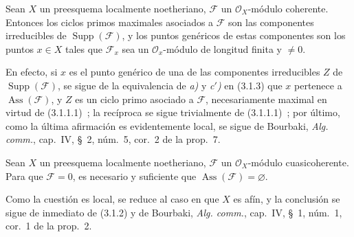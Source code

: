 \begin{corollary}[3.1.4]
\label{IV.2.3.1.4-fr}
Sean $X$ un preesquema localmente noetheriano, $\mathcal F$ un
$\mathcal O_X$-módulo coherente. Entonces los ciclos primos maximales asociados
a $\mathcal F$ son las componentes irreducibles de
$\operatorname{Supp}(\mathcal F)$, y los puntos genéricos de estas componentes
son los puntos $x\in X$ tales que $\mathcal F_x$ sea un
$\mathcal O_x$-módulo de longitud finita y $\ne0$.
\end{corollary}

En efecto, si $x$ es el punto genérico de una de las componentes irreducibles
$Z$ de $\operatorname{Supp}(\mathcal F)$, se sigue de la equivalencia de
\emph{a)} y \emph{c$'$)} en (3.1.3) que $x$ pertenece a
$\operatorname{Ass}(\mathcal F)$, y $Z$ es un ciclo primo asociado a
$\mathcal F$, necesariamente maximal en virtud de (3.1.1.1)~; la recíproca se
sigue trivialmente de (3.1.1.1)~; por último, como la última afirmación es
evidentemente local, se sigue de Bourbaki, \emph{Alg. comm.}, cap.~IV, \S~2,
núm.~5, cor.~2 de la prop.~7.

\begin{corollary}[3.1.5]
Sean $X$ un preesquema localmente noetheriano, $\mathcal F$ un
$\mathcal O_X$-módulo cuasicoherente. Para que $\mathcal F=0$, es necesario y
suficiente que $\operatorname{Ass}(\mathcal F)=\varnothing$.
\end{corollary}

Como la cuestión es local, se reduce al caso en que $X$ es afín, y la
conclusión se sigue de inmediato de (3.1.2) y de Bourbaki, \emph{Alg. comm.},
cap.~IV, \S~1, núm.~1, cor.~1 de la prop.~2.

